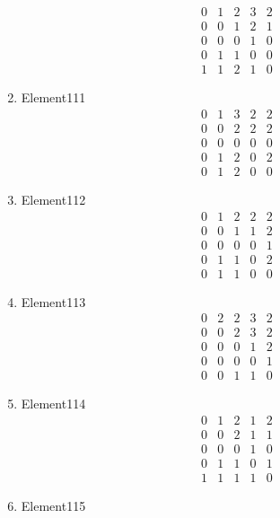 \documentclass[12pt]{article}
\begin{document}
\begin{multicols}{3}
\begin{enumerate}
\begin{equation*}
\begin{array}{ccccc}
0&1&2&3&2\\
0&0&1&2&1\\
0&0&0&1&0\\
0&1&1&0&0\\
1&1&2&1&0
\end{array}
\end{equation*}
\item Element111
\begin{equation*}
\begin{array}{ccccc}
0&1&3&2&2\\
0&0&2&2&2\\
0&0&0&0&0\\
0&1&2&0&2\\
0&1&2&0&0
\end{array}
\end{equation*}
\item Element112
\begin{equation*}
\begin{array}{ccccc}
0&1&2&2&2\\
0&0&1&1&2\\
0&0&0&0&1\\
0&1&1&0&2\\
0&1&1&0&0
\end{array}
\end{equation*}
\item Element113
\begin{equation*}
\begin{array}{ccccc}
0&2&2&3&2\\
0&0&2&3&2\\
0&0&0&1&2\\
0&0&0&0&1\\
0&0&1&1&0
\end{array}
\end{equation*}
\item Element114
\begin{equation*}
\begin{array}{ccccc}
0&1&2&1&2\\
0&0&2&1&1\\
0&0&0&1&0\\
0&1&1&0&1\\
1&1&1&1&0
\end{array}
\end{equation*}
\item Element115
\begin{equation*}
\begin{array}{ccccc}

\end{array}
\end{equation*}
\end{enumerate}
\end{multicols}
\end{document}
